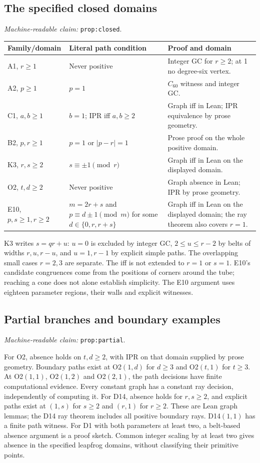 \documentclass[11pt]{amsart}
\newcommand{\record}[1]{\nolinkurl{#1}}
\newcommand{\claimid}[1]{\par\nopagebreak\noindent\textit{Machine-readable claim:} \record{#1}.\par}
\theoremstyle{definition}\newtheorem{definition}{Definition}
\begin{document}
\subsection{The specified closed domains}\label{prop:closed}
\claimid{prop:closed}
\begin{center}\small
\begin{tabular}{p{}p{}p{}}\toprule
Family/domain & Literal path condition & Proof and domain\\\midrule
A1, $r\ge1$ & Never positive & Integer GC for $r\ge2$; at 1 no degree-six vertex.\\
A2, $p\ge1$ & $p=1$ & $C_{60}$ witness and integer GC.\\
C1, $a,b\ge1$ & $b=1$; IPR iff $a,b\ge2$ & Graph iff in Lean; IPR equivalence by prose geometry.\\
B2, $p,r\ge1$ & $p=1$ or $|p-r|=1$ & Prose proof on the whole positive domain.\\
K3, $r,s\ge2$ & $s\equiv\pm1\pmod r$ & Graph iff in Lean on the displayed domain.\\
O2, $t,d\ge2$ & Never positive & Graph absence in Lean; IPR by prose geometry.\\
E10, $p,s\ge1,r\ge2$ & $m=2r+s$ and $p\equiv d\pm1\pmod m$ for some $d\in\{0,r,r+s\}$ & Graph iff in Lean on the displayed domain; the ray theorem also covers $r=1$.\\\bottomrule
\end{tabular}
\end{center}
K3 writes $s=qr+u$: $u=0$ is excluded by integer GC,
$2\le u\le r-2$ by belts of widths $r,u,r-u$, and $u=1,r-1$
by explicit simple paths. The overlapping small cases $r=2,3$ are
separate. The iff is not extended to $r=1$ or $s=1$. E10's candidate
congruences come from the positions of corners around the tube;
reaching a cone does not alone establish simplicity. The E10 argument uses eighteen parameter regions, their walls and
explicit witnesses.

\subsection{Partial branches and boundary examples}\label{prop:partial}
\claimid{prop:partial}
For O2, absence holds on $t,d\ge2$, with IPR on that domain supplied
by prose geometry. Boundary paths exist at O2$(1,d)$ for $d\ge3$ and
O2$(t,1)$ for $t\ge3$. At O2$(1,1)$, O2$(1,2)$ and O2$(2,1)$,
the path decisions have finite computational evidence. Every constant
graph has a constant ray decision, independently of computing it.
For D14, absence holds for $r,s\ge2$, and explicit paths exist at
$(1,s)$ for $s\ge2$ and $(r,1)$ for $r\ge2$. These are Lean graph
lemmas; the D14 ray theorem includes all positive boundary rays.
D14$(1,1)$ has a finite path witness. For D1 with both parameters at
least two, a belt-based absence argument is a proof sketch. Common
integer scaling by at least two gives absence in the specified
leapfrog domains, without classifying their primitive points.
\end{document}
